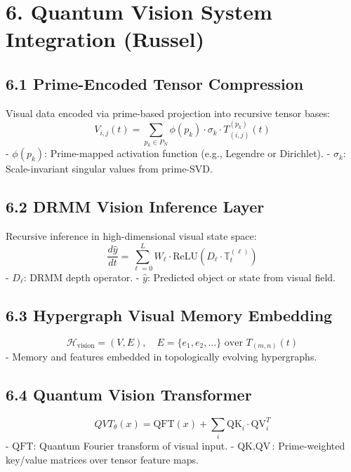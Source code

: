 \documentclass{article}
\theoremstyle{plain}
\begin{document}
\section*{6. Quantum Vision System Integration (Russel)}

\subsection*{6.1 Prime-Encoded Tensor Compression}
Visual data encoded via prime-based projection into recursive tensor bases:
\begin{equation}
V_{i,j}(t) = \sum_{p_k \in P_N} \phi(p_k) \cdot \sigma_k \cdot T_{(i,j)}^{(p_k)}(t)
\end{equation}
- $\phi(p_k)$: Prime-mapped activation function (e.g., Legendre or Dirichlet). 
- $\sigma_k$: Scale-invariant singular values from prime-SVD.

\subsection*{6.2 DRMM Vision Inference Layer}
Recursive inference in high-dimensional visual state space:
\begin{equation}
\frac{d\hat{y}}{dt} = \sum_{\ell=0}^{L} W_\ell \cdot \text{ReLU}\left( D_\ell \cdot \mathbb{T}_t^{(\ell)} \right)
\end{equation}
- $D_\ell$: DRMM depth operator.
- $\hat{y}$: Predicted object or state from visual field.

\subsection*{6.3 Hypergraph Visual Memory Embedding}
\begin{equation}
\mathcal{H}_{\text{vision}} = (V, E), \quad E = \{e_1, e_2, \dots\} \text{ over } T_{(m,n)}(t)
\end{equation}
- Memory and features embedded in topologically evolving hypergraphs.

\subsection*{6.4 Quantum Vision Transformer}
\begin{equation}
QVT_{\theta}(x) = \text{QFT}(x) + \sum_{i} \text{QK}_i \cdot \text{QV}_i^T
\end{equation}
- $\text{QFT}$: Quantum Fourier transform of visual input.
- $\text{QK}, \text{QV}$: Prime-weighted key/value matrices over tensor feature maps.


\nocite{*}


\end{document}
